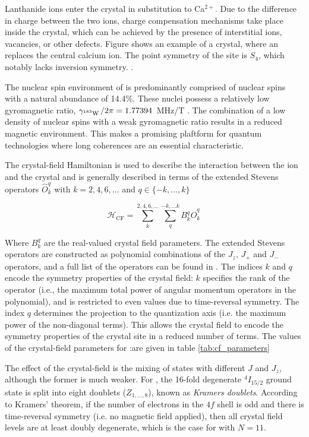 Lanthanide ions enter the crystal in substitution to Ca$^{2+}$. Due to the difference in charge between the two ions, charge compensation mechanisms take place inside the crystal, which can be achieved by the presence of interstitial ions, vacancies, or other defects. Figure  shows an example of a \Ca crystal, where an \Er replaces the central calcium ion. The point symmetry of the \Er site is $S_4$, which notably lacks inversion symmetry. .

The nuclear spin environment of \Ca is predominantly comprised of \W nuclear spins with a natural abundance of 14.4\%. These nuclei possess a relatively low gyromagnetic ratio, $\gamma_{\text{$^{183}$W\,}}/2\pi = 1.77394$~MHz/T . The combination of a low density of nuclear spins with a weak gyromagnetic ratio results in a reduced magnetic environment. This makes \Ca a promising plaftform for quantum technologies where long coherences are an essential characteristic.

The crystal-field Hamiltonian is used to describe the interaction between the ion and the crystal and is generally described in terms of the extended Stevens operators $\hat{O}^q_k$ with $k=2,4,6,\dots$ and $q \in \{-k,\dots, k\}$ 

\begin{equation}
    \mathcal{H}_{\mathrm{CF}} = \sum_{k}^{2,4,6,\dots}\sum_{q}^{-k,...k} B_k^q \hat{O}^q_k \,
\end{equation}

Where $B_k^q$ are the real-valued crystal field parameters. The extended Stevens operators are constructed as polynomial combinations of the $J_z$, $J_+$ and $J_-$ operators, and a full list of the operators can be found in . The indices $k$ and $q$ encode the symmetry properties of the crystal field: $k$ specifies the rank of the operator (i.e., the maximum total power of angular momentum operators in the polynomial), and is restricted to even values due to time-reversal symmetry. The index $q$ determines the projection to the quantization axis (i.e. the maximum power of the non-diagonal terms). This allows the crystal field to encode the symmetry properties of the crystal site in a reduced number of terms. The values of the crystal-field parameters for \Er:\Ca are given in table \ref{tab:cf_parameters}

The effect of the crystal-field is the mixing of states with different $J$ and $J_z$, although the former is much weaker. For \Er, the 16-fold degenerate $^4I_{15/2}$ ground state is split into eight doublets ($Z_{1,\dots,8}$), known as \emph{Kramers doublets}. According to Kramers' theorem,  if the number of electrons in the $4f$ shell is odd and there is time-reversal symmetry (i.e. no magnetic field applied), then all crystal field levels are at least doubly degenerate, which is the case for \Er with $N=11$.

